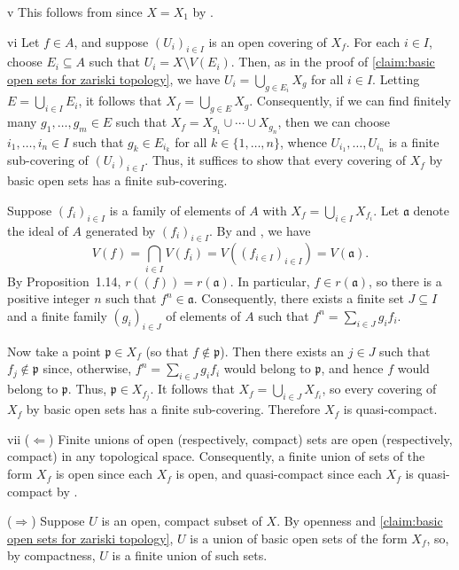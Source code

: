 \begin{partsolution}{v}
This follows from  since \(X = X_1\) by .
\end{partsolution}

\begin{partsolution}{vi}
Let \(f \in A\), and suppose \((U_i)_{i \in I}\) is an open covering of \(X_f\).
For each \(i \in I\), choose \(E_i \subseteq A\) such that \(U_i = X \setminus V(E_i)\).
Then, as in the proof of \autoref{claim:basic open sets for zariski topology}, we have \(U_i = \bigcup_{g \in E_i} X_g\) for all \(i \in I\).
Letting \(E = \bigcup_{i \in I} E_i\), it follows that \(X_f = \bigcup_{g \in E} X_g\).
Consequently, if we can find finitely many \(g_1, \ldots, g_m \in E\) such that \(X_f = X_{g_1} \cup \cdots \cup X_{g_n}\), then we can choose \(i_1, \ldots, i_n \in I\) such that \(g_k \in E_{i_k}\) for all \(k \in \{1, \ldots, n\}\), whence \(U_{i_1}, \ldots, U_{i_n}\) is a finite sub-covering of \((U_i)_{i \in I}\).
Thus, it suffices to show that every covering of \(X_f\) by basic open sets has a finite sub-covering.

Suppose \((f_i)_{i \in I}\) is a family of elements of \(A\) with \(X_f = \bigcup_{i \in I} X_{f_i}\).
Let \(\mathfrak{a}\) denote the ideal of \(A\) generated by \((f_i)_{i \in I}\).
By  and , we have
\begin{equation*}
V(f) = \bigcap_{i \in I} V(f_i) = V\left((f_{i \in I})_{i \in I}\right) = V(\mathfrak{a}).
\end{equation*}
By Proposition~1.14, \(r((f)) = r(\mathfrak{a})\).
In particular, \(f \in r(\mathfrak{a})\), so there is a positive integer \(n\) such that \(f^n \in \mathfrak{a}\).
Consequently, there exists a finite set \(J \subseteq I\) and a finite family \((g_i)_{i \in J}\) of elements of \(A\) such that \(f^n = \sum_{i \in J} g_i f_i\).

Now take a point \(\mathfrak{p} \in X_f\) (so that \(f \notin \mathfrak{p}\)).
Then there exists an \(j \in J\) such that \(f_j \notin \mathfrak{p}\) since, otherwise, \(f^n = \sum_{i \in J} g_i f_i\) would belong to \(\mathfrak{p}\), and hence \(f\) would belong to \(\mathfrak{p}\).
Thus, \(\mathfrak{p} \in X_{f_j}\).
It follows that \(X_f = \bigcup_{i \in J} X_{f_i}\), so every covering of \(X_f\) by basic open sets has a finite sub-covering.
Therefore \(X_f\) is quasi-compact.
\end{partsolution}

\begin{partsolution}{vii}
(\(\Leftarrow\))
Finite unions of open (respectively, compact) sets are open (respectively, compact) in any topological space.
Consequently, a finite union of sets of the form \(X_f\) is open since each \(X_f\) is open, and quasi-compact since each \(X_f\) is quasi-compact by .

(\(\Rightarrow\))
Suppose \(U\) is an open, compact subset of \(X\).
By openness and \autoref{claim:basic open sets for zariski topology}, \(U\) is a union of basic open sets of the form \(X_f\), so, by compactness, \(U\) is a finite union of such sets.
\end{partsolution}